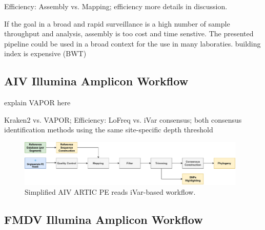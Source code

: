 Efficiency: Assembly vs. Mapping; efficiency more details in discussion.

If the goal in a broad and rapid surveillance is a high number of sample throughput and analysis, assembly is too cost and time senstive. The presented pipeline could be used in a broad context for the use in many laboraties.
building index is expensive (BWT)

\subsection{AIV Illumina Amplicon Workflow}

explain VAPOR here

Kraken2 vs. VAPOR;
Efficiency: LoFreq vs. iVar consensus; both consensus identification methods using the same site-specific depth threshold

\begin{figure}
	\centering
	\includegraphics[width=0.97\textwidth]{media/3-pipelines-AIV.pdf}
	\caption{Simplified AIV ARTIC PE reads iVar-based workflow.}
	\label{fig:3-pipelines-aiv}
\end{figure}

\subsection{FMDV Illumina Amplicon Workflow}
